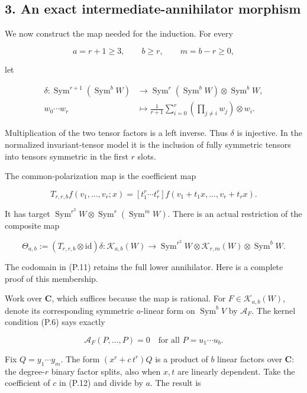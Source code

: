 \documentclass[
  10pt,
]{article}
\begin{document}
\subsection{3. An exact intermediate-annihilator
morphism}\label{an-exact-intermediate-annihilator-morphism}

We now construct the map needed for the induction. For every

\[
a=r+1\ge3,\qquad b\ge r,\qquad m=b-r\ge0,
\tag{P.8}
\]

let

\[
\begin{aligned}
\delta:\operatorname{Sym}^{r+1}(\operatorname{Sym}^{b}W)
&\longrightarrow
\operatorname{Sym}^{r}(\operatorname{Sym}^{b}W)
\otimes\operatorname{Sym}^{b}W,\\
w_0\cdots w_r&\longmapsto
\frac1{r+1}\sum_{i=0}^{r}
\left(\prod_{j\ne i}w_j\right)\otimes w_i.
\end{aligned}
\tag{P.9}
\]

Multiplication of the two tensor factors is a left inverse. Thus
\(\delta\) is injective. In the normalized invariant-tensor model it is
the inclusion of fully symmetric tensors into tensors symmetric in the
first \(r\) slots.

The common-polarization map is the coefficient map

\[
T_{r,r,b}f(v_1,\ldots,v_r;x)
=[t_1^r\cdots t_r^r]
f(v_1+t_1x,\ldots,v_r+t_rx).
\tag{P.10}
\]

It has target \(\operatorname{Sym}^{r^2}W\otimes
\operatorname{Sym}^{r}(\operatorname{Sym}^{m}W)\). There is an actual
restriction of the composite map

\[
\boxed{
\Theta_{a,b}:=(T_{r,r,b}\otimes\mathrm{id})\delta:
\mathcal K_{a,b}(W)\longrightarrow
\operatorname{Sym}^{r^2}W\otimes
\mathcal K_{r,m}(W)\otimes\operatorname{Sym}^{b}W.}
\tag{P.11}
\]

The codomain in (P.11) retains the full lower annihilator. Here is a
complete proof of this membership.

Work over \(\mathbf C\), which suffices because the map is rational. For
\(F\in\mathcal K_{a,b}(W)\), denote its corresponding symmetric
\(a\)-linear form on \(\operatorname{Sym}^{b}V\) by \(\mathcal A_F\).
The kernel condition (P.6) says exactly

\[
\mathcal A_F(P,\ldots,P)=0
\quad\text{for all }P=u_1\cdots u_b.
\tag{P.12}
\]

Fix \(Q=y_1\cdots y_m\). The form \((x^r+c\,t^r)Q\) is a product of
\(b\) linear factors over \(\mathbf C\): the degree-\(r\) binary factor
splits, also when \(x,t\) are linearly dependent. Take the coefficient
of \(c\) in (P.12) and divide by \(a\). The result is
\end{document}
